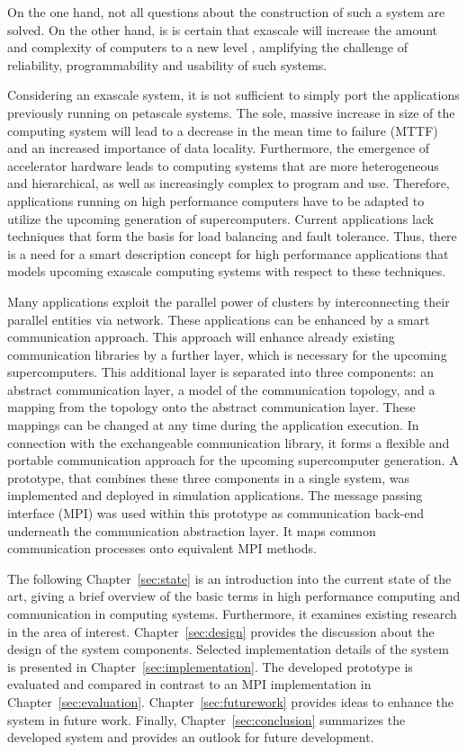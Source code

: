 On the one hand, not all questions about the construction of such a system are
solved. On the other hand, is is certain that exascale will increase the amount and
complexity of computers to a new level \cite{ref:cresta}, amplifying
the challenge of reliability, programmability and usability of such
systems.

Considering an exascale system, it is not sufficient to simply port
the applications previously running on petascale systems. The sole,
massive increase in size of the computing system will lead to a
decrease in the mean time to failure (MTTF) and an increased
importance of data locality.  Furthermore, the emergence of
accelerator hardware leads to computing systems that are more
heterogeneous and hierarchical, as well as increasingly complex to
program and use. Therefore, applications running on high performance
computers have to be adapted to utilize the upcoming generation of
supercomputers.  Current applications lack techniques that form the
basis for load balancing and fault tolerance.  Thus, there is a need
for a smart description concept for high performance applications that
models upcoming exascale computing systems with respect to these
techniques.

Many applications exploit the parallel power of clusters by
interconnecting their parallel entities via network. These
applications can be enhanced by a smart communication approach. This
approach will enhance already existing communication libraries by a
further layer, which is necessary for the upcoming
supercomputers. This additional layer is separated into three
components: an abstract communication layer, a model of the
communication topology, and a mapping from the topology onto the
abstract communication layer.  These mappings can be changed at any
time during the application execution. In connection with the
exchangeable communication library, it forms a flexible and portable
communication approach for the upcoming supercomputer generation.  A
prototype, that combines these three components in a single system,
was implemented and deployed in simulation applications. The message
passing interface (MPI) was used within this prototype as
communication back-end underneath the communication abstraction
layer. It maps common communication processes onto equivalent MPI
methods.

The following Chapter~\ref{sec:state} is an introduction into the
current state of the art, giving a brief overview of the basic terms
in high performance computing and communication in computing
systems. Furthermore, it examines existing research in the area of
interest. Chapter~\ref{sec:design} provides the discussion about the
design of the system components.  Selected implementation details of
the system is presented in Chapter~\ref{sec:implementation}. The
developed prototype is evaluated and compared in contrast to an MPI
implementation in
Chapter~\ref{sec:evaluation}. Chapter~\ref{sec:futurework} provides
ideas to enhance the system in future work. Finally,
Chapter~\ref{sec:conclusion} summarizes the developed system and
provides an outlook for future development.


\cleardoublepage

